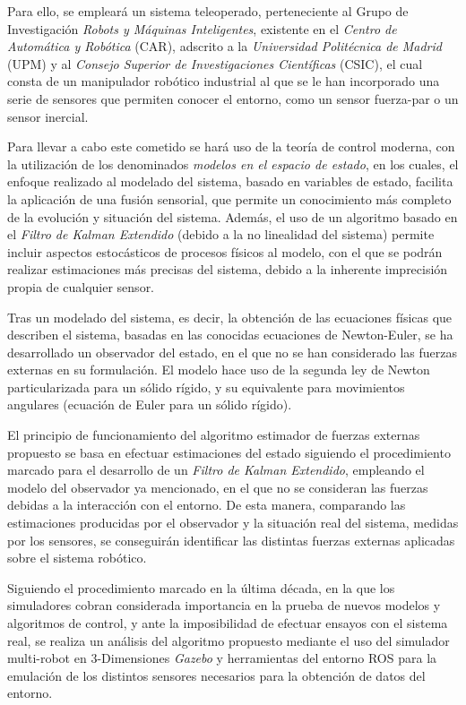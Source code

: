 Para ello, se empleará un sistema teleoperado, perteneciente al Grupo de Investigación \emph{Robots y Máquinas Inteligentes}, existente en el \emph{Centro de Automática y Robótica} (CAR), adscrito a la \emph{Universidad Politécnica de Madrid} (UPM) y al \emph{Consejo Superior de Investigaciones Científicas} (CSIC), el cual consta de un manipulador robótico industrial al que se le han incorporado una serie de sensores que permiten conocer el entorno, como un sensor fuerza-par o un sensor inercial. \par 

Para llevar a cabo este cometido se hará uso de la teoría de control moderna, con la utilización de los denominados \emph{modelos en el espacio de estado}, en los cuales, el enfoque realizado al modelado del sistema, basado en variables de estado, facilita la aplicación de una fusión sensorial, que permite un conocimiento más completo de la evolución y situación del sistema. Además, el uso de un algoritmo basado en el \emph{Filtro de Kalman Extendido} (debido a la no linealidad del sistema) permite incluir aspectos estocásticos de procesos físicos al modelo, con el que se podrán realizar estimaciones más precisas del sistema, debido a la inherente imprecisión propia de cualquier sensor. \par 

Tras un modelado del sistema, es decir, la obtención de las ecuaciones físicas que describen el sistema, basadas en las conocidas ecuaciones de Newton-Euler, se ha desarrollado un observador del estado, en el que no se han considerado las fuerzas externas en su formulación. El modelo hace uso de la segunda ley de Newton particularizada para un sólido rígido, y su equivalente para movimientos angulares (ecuación de Euler para un sólido rígido). \par 

El principio de funcionamiento del algoritmo estimador de fuerzas externas propuesto se basa en efectuar estimaciones del estado siguiendo el procedimiento marcado para el desarrollo de un \emph{Filtro de Kalman Extendido}, empleando el modelo del observador ya mencionado, en el que no se consideran las fuerzas debidas a la interacción con el entorno. De esta manera, comparando las estimaciones producidas por el observador y la situación real del sistema, medidas por los sensores, se conseguirán identificar las distintas fuerzas externas aplicadas sobre el sistema robótico. \par 

Siguiendo el procedimiento marcado en la última década, en la que los simuladores cobran considerada importancia en la prueba de nuevos modelos y algoritmos de control, y ante la imposibilidad de efectuar ensayos con el sistema real, se realiza un análisis del algoritmo propuesto mediante el uso del simulador multi-robot en 3-Dimensiones \emph{Gazebo} y herramientas del entorno ROS para la emulación de los distintos sensores necesarios para la obtención de datos del entorno. \par 

